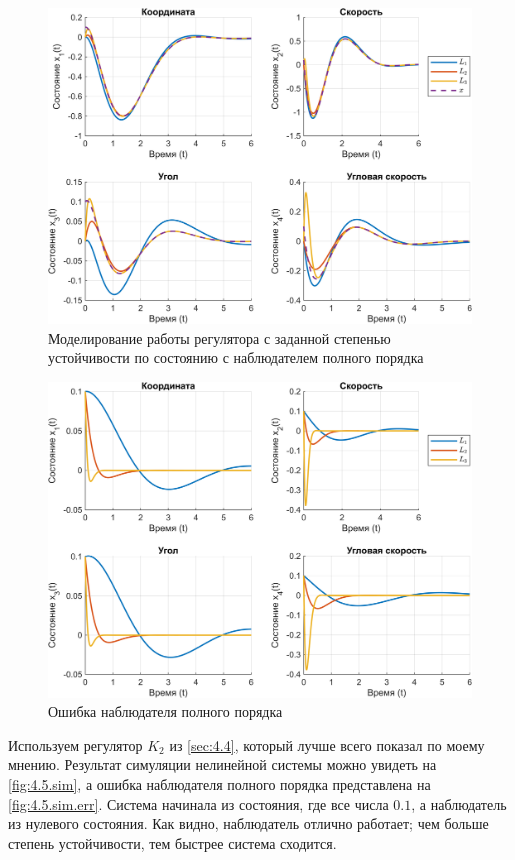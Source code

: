 \begin{figure}[H]
    \centering
    \includegraphics[width=0.8\linewidth]{figs/4.5.sim.png}
    \caption{Моделирование работы регулятора с заданной степенью устойчивости
    по состоянию с наблюдателем полного порядка}
    \label{fig:4.5.sim}
\end{figure}
\begin{figure}[H]
    \centering
    \includegraphics[width=0.8\linewidth]{figs/4.5.sim.err.png}
    \caption{Ошибка наблюдателя полного порядка}
    \label{fig:4.5.sim.err}
\end{figure}
\indent Используем регулятор $K_2$ из \autoref{sec:4.4}, который лучше всего
показал по моему мнению.
Результат симуляции нелинейной системы можно увидеть на \autoref{fig:4.5.sim},
а ошибка наблюдателя полного порядка представлена на \autoref{fig:4.5.sim.err}.
Система начинала из состояния, где все числа $0.1$, а
наблюдатель из нулевого состояния. Как видно, наблюдатель отлично работает;
чем больше степень устойчивости, тем быстрее система сходится.

